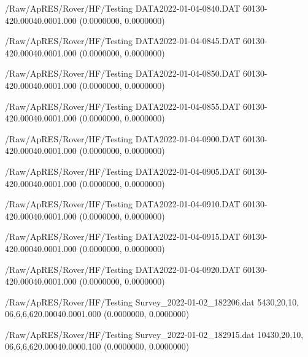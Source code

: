 \hfaprestable
{/Raw/ApRES/Rover/HF/Testing}%
{DATA2022-01-04-0840.DAT}%
{60}{1}{30}{-4}{20.000}{40.000}{1.000}%
{ (0.0000000, 0.0000000)}%
{}%
{}%

\hfaprestable
{/Raw/ApRES/Rover/HF/Testing}%
{DATA2022-01-04-0845.DAT}%
{60}{1}{30}{-4}{20.000}{40.000}{1.000}%
{ (0.0000000, 0.0000000)}%
{}%
{}%

\hfaprestable
{/Raw/ApRES/Rover/HF/Testing}%
{DATA2022-01-04-0850.DAT}%
{60}{1}{30}{-4}{20.000}{40.000}{1.000}%
{ (0.0000000, 0.0000000)}%
{}%
{}%

\hfaprestable
{/Raw/ApRES/Rover/HF/Testing}%
{DATA2022-01-04-0855.DAT}%
{60}{1}{30}{-4}{20.000}{40.000}{1.000}%
{ (0.0000000, 0.0000000)}%
{}%
{}%

\hfaprestable
{/Raw/ApRES/Rover/HF/Testing}%
{DATA2022-01-04-0900.DAT}%
{60}{1}{30}{-4}{20.000}{40.000}{1.000}%
{ (0.0000000, 0.0000000)}%
{}%
{}%

\hfaprestable
{/Raw/ApRES/Rover/HF/Testing}%
{DATA2022-01-04-0905.DAT}%
{60}{1}{30}{-4}{20.000}{40.000}{1.000}%
{ (0.0000000, 0.0000000)}%
{}%
{}%

\hfaprestable
{/Raw/ApRES/Rover/HF/Testing}%
{DATA2022-01-04-0910.DAT}%
{60}{1}{30}{-4}{20.000}{40.000}{1.000}%
{ (0.0000000, 0.0000000)}%
{}%
{}%

\hfaprestable
{/Raw/ApRES/Rover/HF/Testing}%
{DATA2022-01-04-0915.DAT}%
{60}{1}{30}{-4}{20.000}{40.000}{1.000}%
{ (0.0000000, 0.0000000)}%
{}%
{}%

\hfaprestable
{/Raw/ApRES/Rover/HF/Testing}%
{DATA2022-01-04-0920.DAT}%
{60}{1}{30}{-4}{20.000}{40.000}{1.000}%
{ (0.0000000, 0.0000000)}%
{}%
{}%

\hfaprestable
{/Raw/ApRES/Rover/HF/Testing}%
{Survey\_2022-01-02\_182206.dat}%
{5}{4}{30,20,10, 0}{6,6,6,6}{20.000}{40.000}{1.000}%
{ (0.0000000, 0.0000000)}%
{}%
{}%

\hfaprestable
{/Raw/ApRES/Rover/HF/Testing}%
{Survey\_2022-01-02\_182915.dat}%
{10}{4}{30,20,10, 0}{6,6,6,6}{20.000}{40.000}{0.100}%
{ (0.0000000, 0.0000000)}%
{}%
{}%

